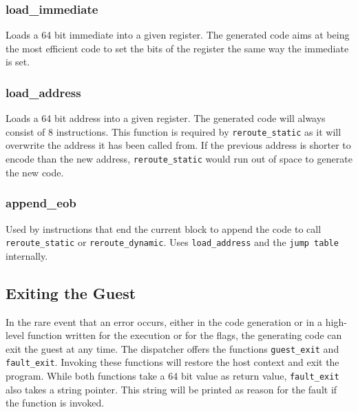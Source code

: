 	\subsubsection{load\_immediate}
	Loads a 64 bit immediate into a given register. The generated code aims at being the most efficient code to set the bits of the register the same way the immediate is set. 
	
	\subsubsection{load\_address}
	Loads a 64 bit address into a given register. The generated code will always consist of 8 instructions. This function is required by \texttt{reroute\_static} as it will overwrite the address it has been called from. If the previous address is shorter to encode than the new address, \texttt{reroute\_static} would run out of space to generate the new code.
	
	\subsubsection{append\_eob}
	Used by instructions that end the current block to append the code to call \texttt{reroute\_static} or \texttt{reroute\_dynamic}. Uses \texttt{load\_address} and the \texttt{jump table} internally.
	
	\subsection{Exiting the Guest}
	In the rare event that an error occurs, either in the code generation or in a high-level function written for the execution or for the flags, the generating code can exit the guest at any time. The dispatcher offers the functions \texttt{guest\_exit} and \texttt{fault\_exit}. Invoking these functions will restore the host context and exit the program. While both functions take a 64 bit value as return value, \texttt{fault\_exit} also takes a string pointer. This string will be printed as reason for the fault if the function is invoked.

\pagebreak
